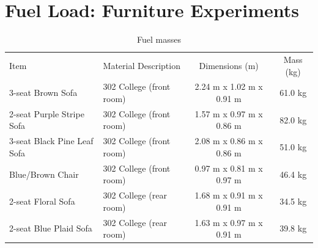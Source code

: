 \documentclass[12pt,oneside]{book}
\begin{document}
\section{Fuel Load: Furniture Experiments}
\label{sec:Fuel_Load:_Furniture_Experiments}

\begin{table}
	\centering
	\caption{Fuel masses}
	\begin{tabular}{llcc}
		\hline\noalign{\smallskip}
		Item                         &  Material Description             &  Dimensions (m)            &  Mass (kg)  \\
		\noalign{\smallskip}\hline\noalign{\smallskip}
		3-seat Brown Sofa            &  302 College (front room)         &  2.24 m x 1.02 m x 0.91 m  &  61.0 kg    \\
		2-seat Purple Stripe Sofa    &  302 College (front room)         &  1.57 m x 0.97 m x 0.86 m  &  82.0 kg    \\
		3-seat Black Pine Leaf Sofa  &  302 College (front room)         &  2.08 m x 0.86 m x 0.86 m  &  51.0 kg    \\
		Blue/Brown Chair             &  302 College (front room)         &  0.97 m x 0.81 m x 0.97 m  &  46.4 kg    \\
		2-seat Floral Sofa           &  302 College (rear room)          &  1.68 m x 0.91 m x 0.91 m  &  34.5 kg    \\
		2-seat Blue Plaid Sofa       &  302 College (rear room)          &  1.63 m x 0.97 m x 0.91 m  &  39.8 kg    \\

\end{tabular}
\end{table}
\end{document}
